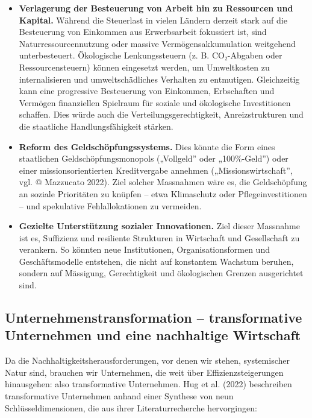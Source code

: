 \documentclass[
  nswissgerman,
  a4paper,
  DIV=11,
  numbers=noendperiod,
  oneside,
  openany]{scrreprt}
\begin{document}
\begin{itemize}
\item
  \textbf{Verlagerung der Besteuerung von Arbeit hin zu Ressourcen und
  Kapital.} Während die Steuerlast in vielen Ländern derzeit stark auf
  die Besteuerung von Einkommen aus Erwerbsarbeit fokussiert ist, sind
  Naturressourcennutzung oder massive Vermögensakkumulation weitgehend
  unterbesteuert. Ökologische Lenkungssteuern (z. B. CO₂-Abgaben oder
  Ressourcensteuern) können eingesetzt werden, um Umweltkosten zu
  internalisieren und umweltschädliches Verhalten zu entmutigen.
  Gleichzeitig kann eine progressive Besteuerung von Einkommen,
  Erbschaften und Vermögen finanziellen Spielraum für soziale und
  ökologische Investitionen schaffen. Dies würde auch die
  Verteilungsgerechtigkeit, Anreizstrukturen und die staatliche
  Handlungsfähigkeit stärken.
\item
  \textbf{Reform des Geldschöpfungssystems.} Dies könnte die Form eines
  staatlichen Geldschöpfungsmonopols („Vollgeld'' oder „100\%-Geld'')
  oder einer missionsorientierten Kreditvergabe annehmen
  („Missionswirtschaft'', vgl. @ Mazzucato 2022). Ziel solcher
  Massnahmen wäre es, die Geldschöpfung an soziale Prioritäten zu
  knüpfen -- etwa Klimaschutz oder Pflegeinvestitionen -- und
  spekulative Fehlallokationen zu vermeiden.
\item
  \textbf{Gezielte Unterstützung sozialer Innovationen.} Ziel dieser
  Massnahme ist es, Suffizienz und resiliente Strukturen in Wirtschaft
  und Gesellschaft zu verankern. So könnten neue Institutionen,
  Organisationsformen und Geschäftsmodelle entstehen, die nicht auf
  konstantem Wachstum beruhen, sondern auf Mässigung, Gerechtigkeit und
  ökologischen Grenzen ausgerichtet sind.
\end{itemize}

\subsection{Unternehmenstransformation -- transformative Unternehmen und
eine nachhaltige
Wirtschaft}\label{unternehmenstransformation-transformative-unternehmen-und-eine-nachhaltige-wirtschaft}

Da die Nachhaltigkeitsherausforderungen, vor denen wir stehen,
systemischer Natur sind, brauchen wir Unternehmen, die weit über
Effizienzsteigerungen hinausgehen: also transformative Unternehmen. Hug
et al. (2022) beschreiben transformative Unternehmen anhand einer
Synthese von neun Schlüsseldimensionen, die aus ihrer Literaturrecherche
hervorgingen:
\end{document}
